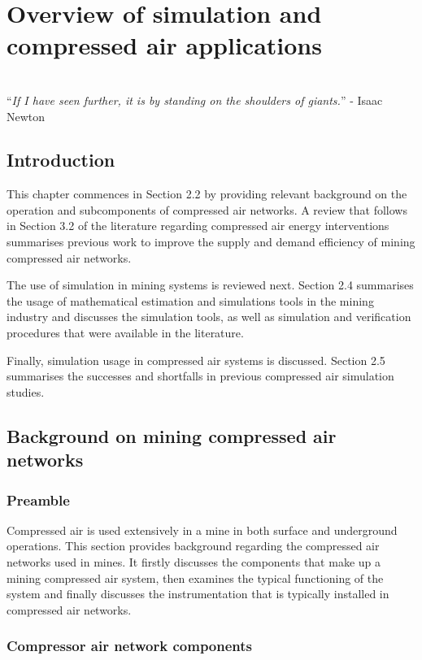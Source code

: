 \chapter{Overview of simulation and compressed air applications}
\label{Chap2}
\thispagestyle{empty}
\vspace{40em}
\hrulefill
\\
\enquote{\textit{If I have seen further, it is by standing on the shoulders of giants.}} - Isaac Newton\\
\clearpage
\section{Introduction}
 This chapter commences in Section 2.2 by providing relevant background on the operation and subcomponents of compressed air networks. A review that follows in Section 3.2 of the literature regarding compressed air energy interventions summarises previous work to improve the supply and demand efficiency of mining compressed air networks.
\par
The use of simulation in mining systems is reviewed next. Section 2.4 summarises the usage of mathematical estimation and simulations tools in the mining industry and discusses the simulation tools, as well as simulation and verification procedures that were available in the literature.
\par
Finally, simulation usage in compressed air systems is discussed. Section 2.5 summarises the successes and shortfalls in previous compressed air simulation studies.
\section{Background on mining compressed air networks}
\subsection{Preamble}
Compressed air is used extensively in a mine in both surface and underground operations. This section provides background regarding the compressed air networks used in mines. It firstly discusses the components that make up a mining compressed air system, then examines the typical functioning of the system and finally discusses the instrumentation that is typically installed in compressed air networks.
\subsection{Compressor air network components}
